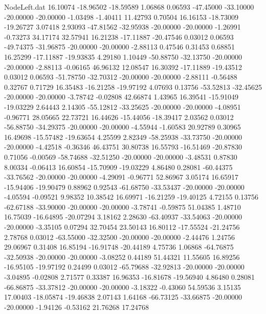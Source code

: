 \begin{filecontents}{NodeLeft.dat}
  16.10074  -18.96502  -18.59589     1.06868    0.06593  -47.45000  -33.10000  -20.00000  -20.00000   -1.03498   -1.40411   11.42793    0.70504
  16.16153  -18.73009  -19.26727     3.07418    2.93093  -47.81562  -32.95938  -20.00000  -20.00000   -1.26991   -0.73273   34.17174   32.57941
  16.21238  -17.11887  -20.47546     0.03012    0.06593  -49.74375  -31.96875  -20.00000  -20.00000   -2.88113    0.47546    0.31453    0.68851
  16.25299  -17.11887  -19.93835     4.29180    1.10449  -50.88750  -32.13750  -20.00000  -20.00000   -2.88113   -0.06165   46.96132   12.08547
  16.30392  -17.11889  -19.43512     0.03012    0.06593  -51.78750  -32.70312  -20.00000  -20.00000   -2.88111   -0.56488    0.32767    0.71729
  16.35483  -16.21258  -19.97192     4.07693    0.13756  -53.52813  -32.45625  -20.00000  -20.00000   -3.78742   -0.02808   42.66874    1.43965
  16.39541  -15.91049  -19.03229     2.64443    2.14305  -55.12812  -33.25625  -20.00000  -20.00000   -4.08951   -0.96771   28.05665   22.73721
  16.44626  -15.44056  -18.39417     2.03562    0.03012  -56.88750  -34.29375  -20.00000  -20.00000   -4.55944   -1.60583   20.92789    0.30965
  16.49698  -15.57482  -19.63654     4.25599    2.82349  -58.25938  -33.73750  -20.00000  -20.00000   -4.42518   -0.36346   46.43751   30.80738
  16.55793  -16.51469  -20.87830     0.71056   -0.00569  -58.74688  -32.51250  -20.00000  -20.00000   -3.48531    0.87830    8.00334   -0.06413
  16.60854  -15.70909  -19.03229     4.86480    0.28081  -60.44375  -33.76562  -20.00000  -20.00000   -4.29091   -0.96771   52.86967    3.05174
  16.65917  -15.94406  -19.90479     0.88962    0.92543  -61.68750  -33.53437  -20.00000  -20.00000   -4.05594   -0.09521    9.98352   10.38542
  16.69971  -16.21259  -19.40125     4.72155    0.13756  -62.67188  -33.90000  -20.00000  -20.00000   -3.78741   -0.59875   51.04385    1.48710
  16.75039  -16.64895  -20.07294     3.18162    2.28630  -63.40937  -33.54063  -20.00000  -20.00000   -3.35105    0.07294   32.70454   23.50143
  16.80112  -17.55524  -21.24756     2.78768    0.03012  -63.55000  -32.32500  -20.00000  -20.00000   -2.44476    1.24756   29.06967    0.31408
  16.85194  -16.91748  -20.44189     4.75736    1.06868  -64.76875  -32.50938  -20.00000  -20.00000   -3.08252    0.44189   51.44321   11.55605
  16.89256  -16.95105  -19.97192     0.24499    0.03012  -65.79688  -32.92813  -20.00000  -20.00000   -3.04895   -0.02808    2.71577    0.33387
  16.96353  -16.81678  -19.56940     4.86480    0.28081  -66.86875  -33.37812  -20.00000  -20.00000   -3.18322   -0.43060   54.59536    3.15135
  17.00403  -18.05874  -19.46838     2.07143    1.64168  -66.73125  -33.66875  -20.00000  -20.00000   -1.94126   -0.53162   21.76268   17.24768

\end{filecontents}
